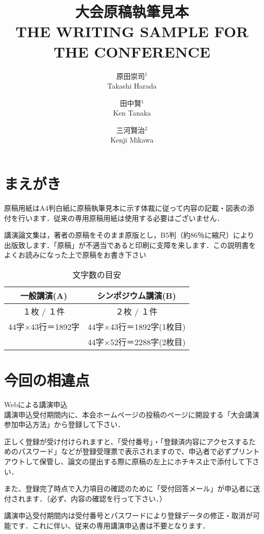 \documentclass[twocolumn, a4paper]{ieicejsp}
\title{{\bf 大会原稿執筆見本}
  {\normalsize \\ THE  WRITING  SAMPLE  FOR  THE  CONFERENCE}}
\author{
    原田崇司$^1$ \\ Takashi  Harada \and
    田中賢$^1$ \\ Ken Tanaka \and
    三河賢治$^2$ \\ Kenji Mikawa
  }
\begin{document}
\maketitle
\section{まえがき}
原稿用紙はA4判白紙に原稿執筆見本に示す体裁に従って内容の記載・図表の添付を行います．従来の専用原稿用紙は使用する必要はございません．

講演論文集は，著者の原稿をそのまま原版とし，B5判（約86％に縮尺）により出版致します．「原稿」が不適当であると印刷に支障を来します．この説明書をよくお読みになった上で原稿をお書き下さい
\begin{table}[h]
\small
\caption{文字数の目安}
\begin{tabular}[t]{|c|c|}
\hline
  一般講演(A) & シンポジウム講演(B)\\
\hline
  １枚 / １件         & ２枚 / １件 \\
  44字×43行＝1892字 & 44字×43行＝1892字(1枚目) \\
                     & 44字×52行＝2288字(2枚目) \\
\hline
\end{tabular}
\end{table}

\section{今回の相違点}
\begin{newenumerate}
\item Webによる講演申込 \\
講演申込受付期間内に、本会ホームページの投稿のページに開設する「大会講演参加申込方法」から登録して下さい．

正しく登録が受け付けられますと、「受付番号」・「登録済内容にアクセスするためのパスワード」などが登録受理票で表示されますので、申込者で必ずプリントアウトして保管し、論文の提出する際に原稿の左上にホチキス止で添付して下さい．

また、登録完了時点で入力項目の確認のために「受付回答メール」が申込者に送付されます．（必ず、内容の確認を行って下さい．）

講演申込受付期間内は受付番号とパスワードにより登録データの修正・取消が可能です．これに伴い、従来の専用講演申込書は不要となります．
\end{newenumerate}
\end{document}
